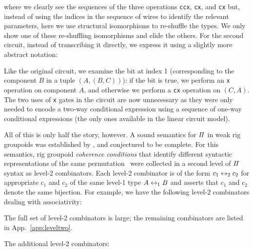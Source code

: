 \medskip

\adder{}

\addertwo{}

\noindent where we clearly see the sequences of the three operations \verb|ccx|, \verb|cx|, and \verb|cx| but, instead
of using the indices in the sequence of wires to identify the relevant parameters, here we use structural isomorphisms
to re-shuffle the types. We only show one of these re-shuffling isomorphisms and elide the others. For the second circuit, instead of transcribing it directly, we express it using
a slightly more abstract notation:

\medskip

\resettwo{}

\noindent Like the original circuit, we examine the bit at index 1 (corresponding to the component $B$ in a tuple
$(A,(B,C))$): if the bit is true, we perform an \verb|x| operation on component $A$, and otherwise we perform a
\verb|cx| operation on $(C,A)$. The two uses of \verb|x| gates in the circuit are now unnecessary as they were only needed
to encode a two-way conditional expression using a sequence of one-way conditional expressions (the only ones available in
the linear circuit model).

All of this is only half the story, however. A sound semantics for $\mathit{\Pi}$ in weak rig
groupoids was established by \citet{caretteComputingSemiringsWeak2016}, and conjectured to be complete. For this
semantics, rig groupoid \emph{coherence conditions} that identify different syntactic representations of the same
permutation~\cite{laplaza72,caretteComputingSemiringsWeak2016} were collected  in a
second level of $\mathit{\Pi}$ syntax as level-2 combinators.  Each level-2 combinator is of the form $c_1 \leftrightarrow_2 c_2$ for appropriate
$c_1$ and $c_2$ of the same level-1 type $A \leftrightarrow_1 B$ and asserts that $c_1$ and $c_2$ denote the same bijection. For
example, we have the following level-2 combinators dealing with associativity:

\medskip

\leveltwoblockone{}

\noindent The full set of level-2 combinators is large; the remaining combinators are listed in App.~\ref{app:leveltwo}.

\begin{toappendix}
  \label{app:leveltwo}

  The additional level-2 combinators:

  \medskip
  \leveltwoblocktwo{}
\end{toappendix}

